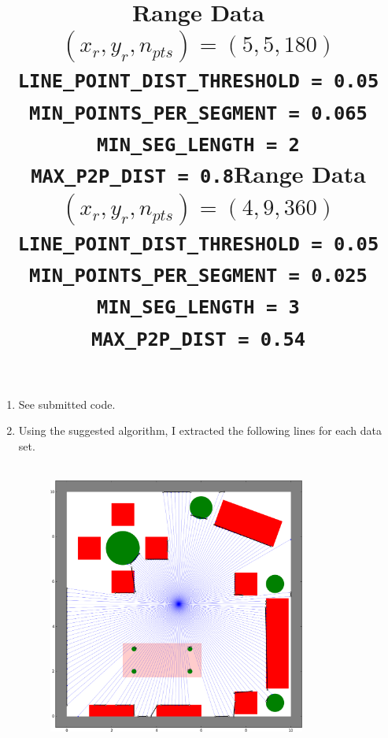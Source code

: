\documentclass[12pt]{article}
\begin{document}
\begin{enumerate}
	\item See submitted code.
	\item Using the suggested algorithm, I extracted the following lines for each data set.
	\begin{figure}[H]
		\centering
		\title{\bf Range Data $(x_r, y_r, n_{pts}) = (5,5,180)$ \\ \vspace{2.5mm}
			\verb|LINE_POINT_DIST_THRESHOLD = 0.05| \\
			\verb|MIN_POINTS_PER_SEGMENT = 0.065| \\
			\verb|MIN_SEG_LENGTH = 2| \\
			\verb|MAX_P2P_DIST = 0.8|}
		\\ \vspace{5mm}
		\includegraphics[width=0.8\textwidth]{../Figures/hw2_2_ii_55180.png}
	\end{figure}
	\begin{figure}[H]
		\centering
		\title{\bf Range Data $(x_r, y_r, n_{pts}) = (4,9,360)$ \\ \vspace{2.5mm}
			\verb|LINE_POINT_DIST_THRESHOLD = 0.05| \\
			\verb|MIN_POINTS_PER_SEGMENT = 0.025| \\
			\verb|MIN_SEG_LENGTH = 3| \\
			\verb|MAX_P2P_DIST = 0.54|}
		\\ \vspace{5mm}

\end{figure}
\end{enumerate}
\end{document}

